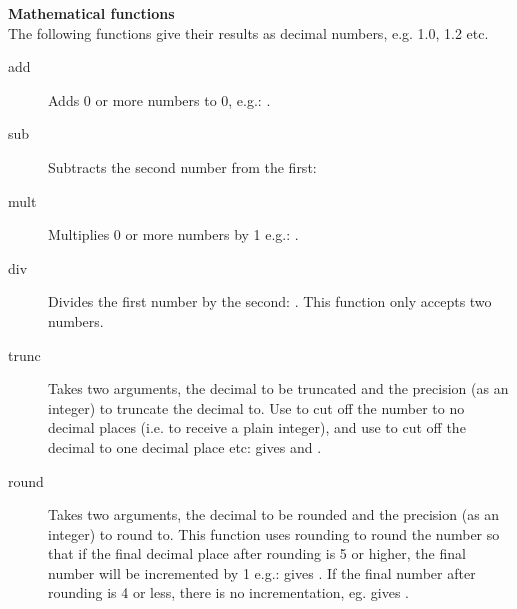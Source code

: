 \textbf{Mathematical functions}\\
The following functions give their results as decimal numbers, e.g. 1.0, 1.2 etc. 
\begin{description}
\item [add]{Adds 0 or more numbers to 0, e.g.: .}
\item [sub]{Subtracts the second number from the first: }
\item [mult]{Multiplies 0 or more numbers by 1 e.g.: .}
\item [div]{Divides the first number by the second: . This function only accepts two numbers.}
\item [trunc]{Takes two arguments, the decimal to be truncated and the precision (as an integer) to truncate the decimal to. Use  to cut off the number to no decimal places (i.e. to receive a plain integer), and use  to cut off the decimal to one decimal place etc:  gives  and .}
\item [round]{Takes two arguments, the decimal to be rounded and the precision (as an integer) to round to. This function uses  rounding to round the number so that if the final decimal place after rounding is 5 or higher, the final number will be incremented by 1 e.g.:  gives . If the final number after rounding is 4 or less, there is no incrementation, eg.  gives . }
\end{description}


